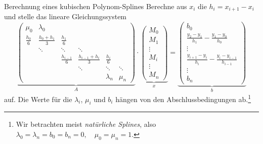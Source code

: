 \begin{defi}{Berechnung eines kubischen Polynom-Splines}
    Berechne aus $x_i$ die $h_i = x_{i+1} - x_i$ und stelle das lineare Gleichungssystem 
    \[
        \underbrace{
            \begin{pmatrix}
                \mu_{0}         & \lambda_{0}           &                   &                         &                  &          \\
                \frac{h_{0}}{6} & \frac{h_{0}+h_{1}}{3} & \frac {h_{1}}{6}  &                         &                  &          \\
                                & \ddots                & \ddots            & \ddots                  &                  &          \\
                                &                       & \frac{h_{i-1}}{6} & \frac{h_{i-1}+h_{i}}{3} & \frac {h_{i}}{6} &          \\
                                &                       &                   & \ddots                  & \ddots           & \ddots   \\
                                &                       &                   &                         & \lambda _{n}     & \mu _{n}
            \end{pmatrix}
        }_{A}
        \cdot 
        \underbrace{
            \begin{pmatrix}
                M_{0} \\ M_{1} \\ \vdots \\ M_{i} \\ \vdots \\ M_{n}
            \end{pmatrix}
        }_{x}
        =
        \underbrace{
            \begin{pmatrix}
                b_{0}                                                       \\
                \frac{y_{2}-y_{1}}{h_{1}} - \frac{y_{1}-y_{0}}{h_{0}}       \\
                \vdots                                                      \\
                \frac{y_{i+1}-y_{i}}{h_{i}} - \frac{y_{i}-y_{i-1}}{h_{i-1}} \\
                \vdots                                                      \\
                b_{n}
            \end{pmatrix}
        }_{b}
    \]
    auf. 
    Die Werte für die $\lambda_i$, $\mu_i$ und $b_i$ hängen von den Abschlussbedingungen ab.\footnote{Wir betrachten meist \emph{natürliche Splines}, also $\lambda_0 = \lambda_n = b_0 = b_n = 0, \quad \mu_0 = \mu_n = 1$.}
    

\end{defi}
